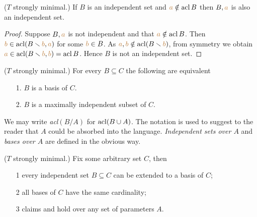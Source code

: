 \begin{lemma}\label{indipendenza+1}
($T$ strongly minimal.) If $B$ is an independent set and ${\color{brown} a}\notin \mathop{\rm acl} B$ then $B,{\color{brown} a}$ is also an independent set.
\end{lemma}
\begin{proof}
Suppose $B,{\color{brown} a}$ is not independent and that ${\color{brown} a}\notin \mathop{\rm acl} B$.
Then ${\color{brown} b}\in\mathop{\rm acl}(B\smallsetminus {\color{brown}b},{\color{brown} a})$ for some ${\color{brown} b}\in B$.
As ${\color{brown} a},{\color{brown} b}\notin\mathop{\rm acl}(B\smallsetminus {\color{brown}b})$, from symmetry we obtain ${\color{brown} a}\in\mathop{\rm acl}(B\smallsetminus {\color{brown}b},{\color{brown} b})=\mathop{\rm acl} B$.
Hence $B$ is not an independent set.
\end{proof}

\begin{corollary}\label{basemassimale}
($T$ strongly minimal.) For every $B\subseteq C$ the following are equivalent
\begin{itemize}
\item[1.] $B$ is a basis of $C$.
\item[2.] $B$ is a maximally independent subset of $C$.\QED
\end{itemize}
\end{corollary}

We may write \emph{acl$(B/A)$\/} for $\mathop{\rm acl}(B\cup A)$.
The notation is used to suggest to the reader that $A$ could be absorbed into the language.
\emph{Independent sets over $A$\/} and \emph{bases over $A$\/} are defined in the obvious way.

\begin{theorem} ($T$ strongly minimal.) Fix some arbitrary set $C$, then
\begin{itemize}
\item[1] every independent set $B\subseteq C$ can be extended to a basis of $C$;
\item[2] all bases of $C$ have the same cardinality;
\item[3] claims  and  hold over any set of parameters $A$.
\end{itemize}
\end{theorem}

